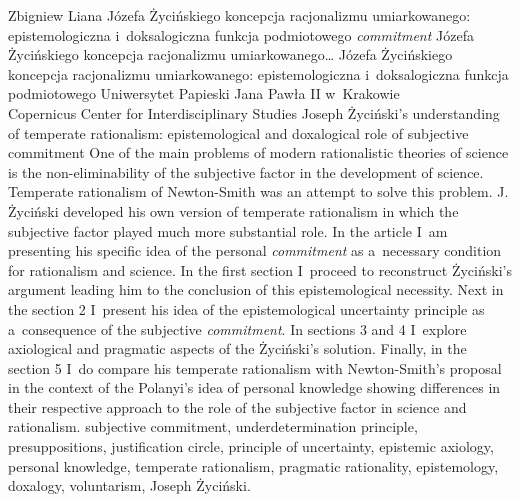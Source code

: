 \begin{artplenv}{Zbigniew Liana}
	{Józefa Życińskiego koncepcja racjonalizmu umiarkowanego: epistemologiczna i~doksalogiczna funkcja podmiotowego \textit{commitment}}
	{Józefa Życińskiego koncepcja racjonalizmu umiarkowanego\ldots}
	{Józefa Życińskiego koncepcja racjonalizmu umiarkowanego: epistemologiczna i~doksalogiczna funkcja podmiotowego }
	{Uniwersytet Papieski Jana Pawła II w~Krakowie\\	
	Copernicus Center for Interdisciplinary Studies\label{liana-anfang}}
	{Joseph Życiński's understanding of temperate rationalism: epistemological and doxalogical role of subjective commitment}
	{One of the main problems of modern rationalistic theories of science is the non-eliminability of the subjective factor in the development of science. Temperate rationalism of Newton-Smith was an attempt to solve this problem. J. Życiński developed his own version of temperate rationalism in which the subjective factor played much more substantial role. In the article I~am presenting his specific idea of the personal \textit{commitment} as a~necessary condition for rationalism and science. In the first section I~proceed to reconstruct Życiński's argument leading him to the conclusion of this epistemological necessity. Next in the section 2 I~present his idea of the epistemological uncertainty principle as a~consequence of the subjective \textit{commitment}. In sections 3 and 4 I~explore axiological and pragmatic aspects of the Życiński's solution. Finally, in the section 5 I~do compare his temperate rationalism with Newton-Smith's proposal in the context of the Polanyi's idea of personal knowledge showing differences in their respective approach to the role of the subjective factor in science and rationalism.}
	{subjective commitment, underdetermination principle, presuppositions, justification circle, principle of uncertainty, epistemic axiology, personal knowledge, temperate rationalism, pragmatic rationality, epistemology, doxalogy, voluntarism, Joseph Życiński.}



\end{artplenv}
